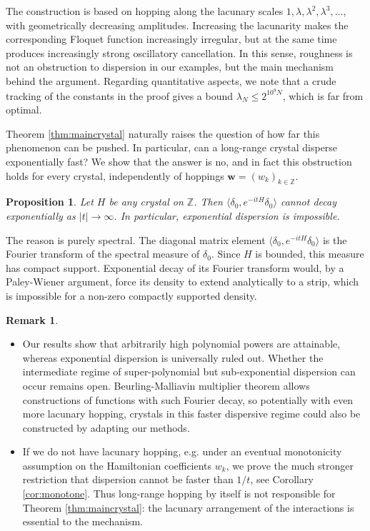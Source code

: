 \documentclass[11pt]{amsart}
\theoremstyle{plain}
\newtheorem{proposition}[theorem]{Proposition}
\theoremstyle{definition}
\newtheorem{remark}[theorem]{Remark}
\numberwithin{equation}{section}
\begin{document}
The construction is based on hopping along the lacunary scales $1,\lambda,\lambda^2,\lambda^3,\ldots$, with geometrically decreasing amplitudes. Increasing the lacunarity makes the corresponding Floquet function increasingly irregular, but at the same time produces increasingly strong oscillatory cancellation. In this sense, roughness is not an obstruction to dispersion in our examples, but the main mechanism behind the argument. Regarding quantitative aspects, we note that a crude tracking of the constants in the proof gives a bound $\lambda_N\leq 2^{10^9N}$, which is far from optimal.

Theorem \ref{thm:maincrystal} naturally raises the question of how far this phenomenon can be pushed. In particular, can a long-range crystal disperse exponentially fast? We show that the answer is no, and in fact this obstruction holds for every crystal, independently of hoppings $\mathbf{w} = (w_k)_{k \in \mathbb Z}$.

\begin{proposition}\label{thm:noexponential-intro}
Let $H$ be any crystal on $\mathbb Z$. Then $\langle \delta_0,e^{-itH}\delta_0\rangle$ cannot decay exponentially as $|t|\to\infty$. In particular, exponential dispersion is impossible.
\end{proposition}

The reason is purely spectral. The diagonal matrix element $\langle\delta_0,e^{-itH}\delta_0\rangle$ is the Fourier transform of the spectral measure of $\delta_0$. Since $H$ is bounded, this measure has compact support. Exponential decay of its Fourier transform would, by a Paley-Wiener argument, force its density to extend analytically to a strip, which is impossible for a non-zero compactly supported density. 

\begin{remark}
\begin{itemize}
    \item[(1)] Our results show that arbitrarily high polynomial powers are attainable, whereas exponential dispersion is universally ruled out. Whether the intermediate regime of super-polynomial but sub-exponential dispersion can occur remains open. Beurling-Malliavin multiplier theorem \cite{BM} allows constructions of functions with such Fourier decay, so potentially with even more lacunary hopping, crystals in this faster dispersive regime could also be constructed by adapting our methods.

\item[(2)] If we do not have lacunary hopping, e.g. under an eventual monotonicity assumption on the Hamiltonian coefficients $w_k$, we prove the much stronger restriction that dispersion cannot be faster than $1/t$, see Corollary \ref{cor:monotone}. Thus long-range hopping by itself is not responsible for Theorem \ref{thm:maincrystal}: the lacunary arrangement of the interactions is essential to the mechanism.
\end{itemize}
\end{remark}
\end{document}
